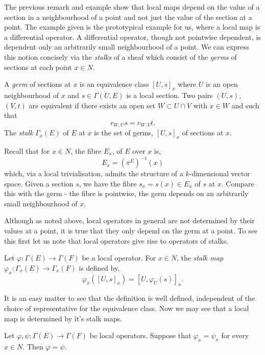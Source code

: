 \documentclass{amsart}
\begin{document}
The previous remark and example show that local maps depend on the value of a section in a neighbourhood of a point and not just the value of the section at a point. The example given is the prototypical example for us, where a local map is a differential operator. A differential operator, though not pointwise dependent, is dependent only an arbitrarily small neighbourhood of a point. We can express this notion concisely via the \emph{stalks} of a sheaf which consist of the \emph{germs} of sections at each point \(x \in N\).

\begin{defn}
A \emph{germ} of sections at \(x\) is an equivalence class \([U, s]_x\) where \(U\) is an open neighbourhood of \(x\) and \(s \in \Gamma(U, E)\) is a local section. Two pairs \((U, s)\), \((V, t)\) are equivalent if there exists an open set \(W \subset U \cap V\) with \(x \in W\) and such that
\[
r_{W, U} s = r_{W, V} t.
\]
The \emph{stalk} \(\Gamma_x(E)\) of \(E\) at \(x\) is the set of germs, \([U, s]_x\) of sections at \(x\).
\end{defn}

\begin{rem}
Recall that for \(x \in N\), the fibre \(E_x\), of \(E\) over \(x\) is,
\[
E_x = (\pi^E)^{-1} (x)
\]
which, via a local trivialisation, admits the structure of a \(k\)-dimensional vector space. Given a section \(s\), we have the fibre \(s_x = s(x) \in E_x\) of \(s\) at \(x\). Compare this with the germ - the fibre is pointwise, the germ depends on an arbitrarily small neighbourhood of \(x\).
\end{rem}

Although as noted above, local operators in general are not determined by their values at a point, it is true that they only depend on the germ at a point. To see this first let us note that local operators give rise to operators of stalks.

\begin{defn}
Let \(\varphi : \Gamma(E) \to \Gamma(F)\) be a local operator. For \(x \in N\), the \emph{stalk map} \(\varphi_x : \Gamma_x(E) \to \Gamma_x (F)\) is defined by,
\[
\varphi_x ([U, s]_x) = [U, \varphi_U(s)]_x.
\]
\end{defn}

It is an easy matter to see that the definition is well defined, independent of the choice of representative for the equivalence class. Now we may see that a local map is determined by it's stalk maps.

\begin{lemma}
Let \(\varphi, \psi : \Gamma(E) \to \Gamma(F)\) be local operators. Suppose that \(\varphi_x = \psi_x\) for every \(x \in N\). Then \(\varphi = \psi\).
\end{lemma}
\end{document}
